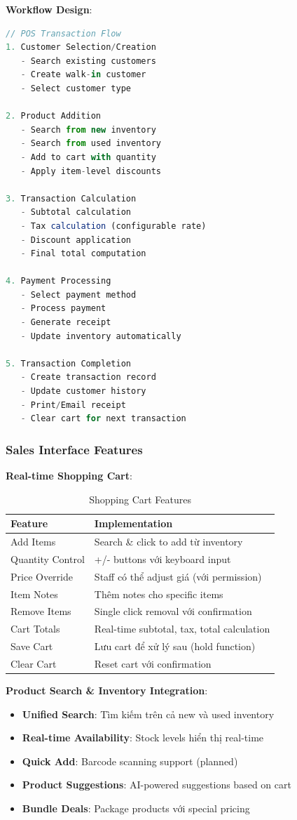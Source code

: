 \documentclass[12pt,a4paper]{article}
\begin{document}
\textbf{Workflow Design}:
\begin{lstlisting}[language=javascript, caption=POS Transaction Workflow]
// POS Transaction Flow
1. Customer Selection/Creation
   - Search existing customers
   - Create walk-in customer
   - Select customer type

2. Product Addition
   - Search from new inventory
   - Search from used inventory  
   - Add to cart with quantity
   - Apply item-level discounts

3. Transaction Calculation
   - Subtotal calculation
   - Tax calculation (configurable rate)
   - Discount application
   - Final total computation

4. Payment Processing
   - Select payment method
   - Process payment
   - Generate receipt
   - Update inventory automatically

5. Transaction Completion
   - Create transaction record
   - Update customer history
   - Print/Email receipt
   - Clear cart for next transaction
\end{lstlisting}

\subsubsection{Sales Interface Features}
\textbf{Real-time Shopping Cart}:
\begin{table}[H]
\centering
\begin{tabular}{@{}ll@{}}
\toprule
\textbf{Feature} & \textbf{Implementation} \\
\midrule
Add Items & Search \& click to add từ inventory \\
Quantity Control & +/- buttons với keyboard input \\
Price Override & Staff có thể adjust giá (với permission) \\
Item Notes & Thêm notes cho specific items \\
Remove Items & Single click removal với confirmation \\
Cart Totals & Real-time subtotal, tax, total calculation \\
Save Cart & Lưu cart để xử lý sau (hold function) \\
Clear Cart & Reset cart với confirmation \\
\bottomrule
\end{tabular}
\caption{Shopping Cart Features}
\end{table}

\textbf{Product Search \& Inventory Integration}:
\begin{itemize}
    \item \textbf{Unified Search}: Tìm kiếm trên cả new và used inventory
    \item \textbf{Real-time Availability}: Stock levels hiển thị real-time
    \item \textbf{Quick Add}: Barcode scanning support (planned)
    \item \textbf{Product Suggestions}: AI-powered suggestions based on cart
    \item \textbf{Bundle Deals}: Package products với special pricing
\end{itemize}
\end{document}
